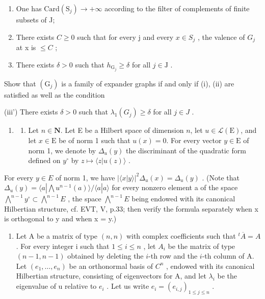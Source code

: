 \begin{enumerate}
\def\labelenumi{(\roman{enumi})}
\item
  One has \(\mathrm{Card}(\mathrm{S}_{j}) \to +\infty\) according to the filter of complements of finite subsets of J;
\item
  There exists \(C \geqslant 0\) such that for every j and every \(x \in S_{j}\) , the valence of \(G_{j}\) at x is \(\leqslant C\) ;
\item
  There exists \(\delta > 0\) such that \(h_{\mathrm{G}_j} \geqslant \delta\) for all \(j \in \mathrm{J}\) .
\end{enumerate}

Show that \((\mathrm{G}_{j})\) is a family of expander graphs if and only if (i), (ii) are satisfied as well as the condition

(iii') There exists \(\delta > 0\) such that \(\lambda_1(G_j) \geqslant \delta\) for all \(j \in J\) .

\begin{enumerate}
\def\labelenumi{\arabic{enumi})}
\setcounter{enumi}{16}
\tightlist
\item
  \begin{enumerate}
  \def\labelenumii{\alph{enumii})}
  \tightlist
  \item
    Let \(n \in \mathbf{N}\). Let E be a Hilbert space of dimension \(n\), let \(u \in \mathcal{L}(\mathrm{E})\), and let \(x \in \mathrm{E}\) be of norm 1 such that \(u(x) = 0\). For every vector \(y \in \mathrm{E}\) of norm 1, we denote by \(\Delta_u(y)\) the discriminant of the quadratic form defined on \(y^\circ\) by \(z \mapsto \langle z | u(z) \rangle\) .
  \end{enumerate}
\end{enumerate}

For every \(y \in E\) of norm 1, we have \(|\langle x | y \rangle|^{2} \Delta_{u}(x) = \Delta_{u}(y)\) . (Note that \(\Delta_{u}(y) = \langle a | \bigwedge u^{n-1}(a) \rangle / \langle a | a \rangle\) for every nonzero element a of the space \(\bigwedge^{n-1} y^{\circ} \subset \bigwedge^{n-1} E\) , the space \(\bigwedge^{n-1} E\) being endowed with its canonical Hilbertian structure, cf. EVT, V, p.33; then verify the formula separately when x is orthogonal to y and when x = y.)

\begin{enumerate}
\def\labelenumi{\alph{enumi})}
\setcounter{enumi}{1}
\tightlist
\item
  Let A be a matrix of type \((n,n)\) with complex coefficients such that \({}^{t}\overline{A}=A\) . For every integer i such that \(1\leqslant i\leqslant n\) , let \(A_{i}\) be the matrix of type \((n-1,n-1)\) obtained by deleting the \(i\)-th row and the \(i\)-th column of A. Let \((e_{1},\ldots,e_{n})\) be an orthonormal basis of \(C^{n}\) , endowed with its canonical Hilbertian structure, consisting of eigenvectors for A, and let \(\lambda_{i}\) be the eigenvalue of u relative to \(e_{i}\) . Let us write \(e_{i}=(e_{i,j})_{1\leqslant j\leqslant n}\) .
\end{enumerate}

